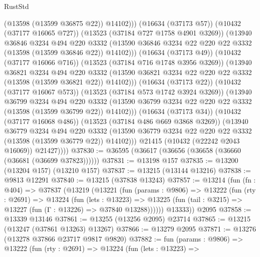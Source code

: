\begin{lexlean}{RustStd}
\begin{coremodule}
                          (@13598 (@13599 @36875 @22))
                          @14102)))
                    (@16634 (@37173 @57))
                    (@10432 (@37177 @16065 @727))
                    (@13523 (@37184 @727 @1758 @4901 @3269))
                    (@13940
                      @36846
                      @3234
                      @494
                      @220
                      @3332
                      (@13590 @36846 @3234 @22 @220 @22 @3332 (@13598 (@13599 @36846 @22)) @14102)))
                  (@16634 (@37173 @49))
                  (@10432 (@37177 @16066 @716))
                  (@13523 (@37184 @716 @1748 @3956 @3269))
                  (@13940
                    @36821
                    @3234
                    @494
                    @220
                    @3332
                    (@13590 @36821 @3234 @22 @220 @22 @3332 (@13598 (@13599 @36821 @22)) @14102)))
                (@16634 (@37173 @22))
                (@10432 (@37177 @16067 @573))
                (@13523 (@37184 @573 @1742 @3924 @3269))
                (@13940
                  @36799
                  @3234
                  @494
                  @220
                  @3332
                  (@13590 @36799 @3234 @22 @220 @22 @3332 (@13598 (@13599 @36799 @22)) @14102)))
              (@16634 (@37173 @34))
              (@10432 (@37177 @16068 @486))
              (@13523 (@37184 @486 @669 @3868 @3269))
              (@13940
                @36779
                @3234
                @494
                @220
                @3332
                (@13590 @36779 @3234 @22 @220 @22 @3332 (@13598 (@13599 @36779 @22)) @14102)))
            @21415
            (@10432 (@22242 @2043 @16069))
            @21427))))
@37830 := @36595 (@36617 (@36656 (@36658 (@36660 (@36681 (@36699 @37823))))))
@37831 := @13198 @157
@37835 := @13200 (@13204 @157) (@13210 @157)
@37837 := @13215 (@13144 @13216)
@37838 := @9813 @12291
@37840 := @13215 (@37838 @13243)
@37857 := @13214
    (fun (fn : @404) =>
    @37837
      (@13219
        (@13221
          (fun (params : @9806) =>
          @13222
            (fun (rty : @2691) =>
            @13224
              (fun (lets : @13223) =>
              @13225 (fun (tail : @3215) => @13227 (fun (Γ : @13226) => @37840 @13288))))))
        @13333))
    @2095
@37858 := @13339 @13146
@37861 := @13255 (@13256 @2095) @23714
@37865 := @13215 (@13247 (@37861 @13263) @13267)
@37866 := @13279 @2095
@37871 := @13276 (@13278 @37866 @23717 @9817 @9820)
@37882 := fun (params : @9806) =>
  @13222
    (fun (rty : @2691) =>
    @13224
      (fun (lets : @13223) =>

\end{coremodule}
\end{lexlean}
